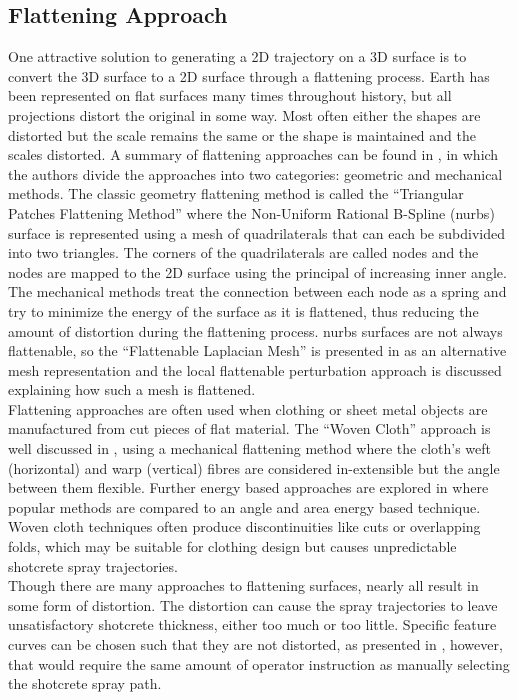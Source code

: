 \subsection{Flattening Approach}
One attractive solution to generating a 2D trajectory on a 3D surface is to convert the 3D surface to a 2D surface through a flattening process. Earth has been represented on flat surfaces many times throughout history, but all projections distort the original in some way. Most often either the shapes are distorted but the scale remains the same or the shape is maintained and the scales distorted. A summary of flattening approaches can be found in \cite{overflat}, in which the authors divide the approaches into two categories: geometric and mechanical methods. The classic geometry flattening method is called the ``Triangular Patches Flattening Method'' where the Non-Uniform Rational B-Spline (\acrshort{nurbs}) surface is represented using a mesh of quadrilaterals that can each be subdivided into two triangles. The corners of the quadrilaterals are called nodes and the nodes are mapped to the 2D surface using the principal of increasing inner angle. The mechanical methods treat the connection between each node as a spring and try to minimize the energy of the surface as it is flattened, thus reducing the amount of distortion during the flattening process. \acrshort{nurbs} surfaces are not always flattenable, so the ``Flattenable Laplacian Mesh'' is presented in \cite{toward} as an alternative mesh representation and the local flattenable perturbation approach is discussed explaining how such a mesh is flattened.\\

Flattening approaches are often used when clothing or sheet metal objects are manufactured from cut pieces of flat material. The ``Woven Cloth'' approach is well discussed in \cite{woven,freef}, using a mechanical flattening method where the cloth's weft (horizontal) and warp (vertical) fibres are considered in-extensible but the angle between them flexible. Further energy based approaches are explored in \cite{parameet} where popular methods are compared to an angle and area energy based technique. Woven cloth techniques often produce discontinuities like cuts or overlapping folds, which may be suitable for clothing design but causes unpredictable shotcrete spray trajectories.\\

Though there are many approaches to flattening surfaces, nearly all result in some form of distortion. The distortion can cause the spray trajectories to leave unsatisfactory shotcrete thickness, either too much or too little. Specific feature curves can be chosen such that they are not distorted, as presented in \cite{wwarp,wwarpp}, however, that would require the same amount of operator instruction as manually selecting the shotcrete spray path.\\

